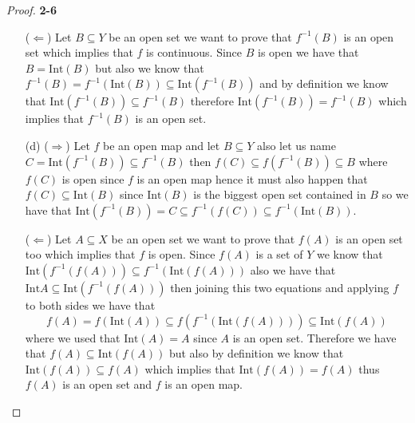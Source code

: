 \documentclass[11pt]{article}
\newcommand{\inter}{\text{Int}}
\theoremstyle{definition}
\begin{document}
\begin{proof}{\textbf{2-6}}
\begin{itemize}
    ($\Leftarrow$) Let $B \subseteq Y$ be an open set we want to prove that
    $f^{-1}(B)$ is an open set which implies that $f$ is continuous.
    Since $B$ is open we have that $B = \inter(B)$
    but also we know that $f^{-1}(B) = f^{-1}(\inter(B)) \subseteq \inter(f^{-1}(B))$
    and by definition we know that $\inter(f^{-1}(B)) \subseteq f^{-1}(B)$
    therefore $\inter(f^{-1}(B)) = f^{-1}(B)$ which implies that $f^{-1}(B)$
    is an open set.

    \item [(d)]
    ($\Rightarrow$) Let $f$ be an open map and let $B \subseteq Y$
    also let us name $C = \inter(f^{-1}(B)) \subseteq f^{-1}(B)$
    then $f(C)\subseteq f(f^{-1}(B)) \subseteq B$ where
    $f(C)$ is open since $f$ is an open map hence it must
    also happen that $f(C) \subseteq \inter(B)$ since $\inter(B)$ is the biggest
    open set contained in $B$ so we have that
    $\inter(f^{-1}(B)) = C \subseteq f^{-1}(f(C)) \subseteq f^{-1}(\inter(B))$.

    ($\Leftarrow$) Let $A \subseteq X$ be an open set we want to prove that
    $f(A)$ is an open set too which implies that $f$ is open.
    Since $f(A)$ is a set of $Y$ we know that
    $\inter (f^{-1}(f(A))) \subseteq f^{-1}(\inter(f(A)))$ also we have that
    $\inter A \subseteq \inter (f^{-1}(f(A)))$ then joining this two
    equations and applying $f$ to both sides we have that
    $$f(A) = f(\inter(A)) \subseteq f(f^{-1}(\inter(f(A)))) \subseteq \inter(f(A)) $$
    where we used that $\inter(A) = A$ since $A$ is an open set.
    Therefore we have that $f(A) \subseteq \inter(f(A))$ but also by definition
    we know that $\inter(f(A)) \subseteq f(A)$ which implies that
    $\inter(f(A)) = f(A)$ thus $f(A)$ is an open set and $f$ is an open map.
\end{itemize}
\end{proof}
\end{document}
